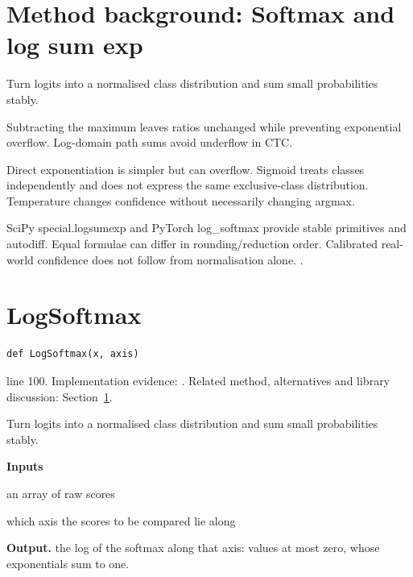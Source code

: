 \section{Method background: Softmax and log sum exp}\label{method:softmax}
Turn logits into a normalised class distribution and sum small probabilities stably.


Subtracting the maximum leaves ratios unchanged while preventing exponential overflow. Log-domain path sums avoid underflow in CTC.


Direct exponentiation is simpler but can overflow. Sigmoid treats classes independently and does not express the same exclusive-class distribution. Temperature changes confidence without necessarily changing argmax.


SciPy special.logsumexp and PyTorch log\_softmax provide stable primitives and autodiff. Equal formulae can differ in rounding/reduction order. Calibrated real-world confidence does not follow from normalisation alone. \cite{gravesbook,scipylogsum,torchnumeric}.


\section{LogSoftmax}\label{fn:recognise:LogSoftmax}
\begin{lstlisting}[style=sig]
def LogSoftmax(x, axis)
\end{lstlisting}
 line 100. Implementation evidence: \cite{code2026}. Related method, alternatives and library discussion: Section~\ref{method:softmax}.


Turn logits into a normalised class distribution and sum small probabilities stably.




\noindent\textbf{Inputs}
\begin{description}[leftmargin=2.2em,style=nextline,font=\normalfont\ttfamily]\setlength\itemsep{1pt}
  \item[{x}] \normalfont an array of raw scores
  \item[{axis}] \normalfont which axis the scores to be compared lie along
\end{description}

\noindent\textbf{Output.} the log of the softmax along that axis: values at most zero, whose exponentials sum to one.


